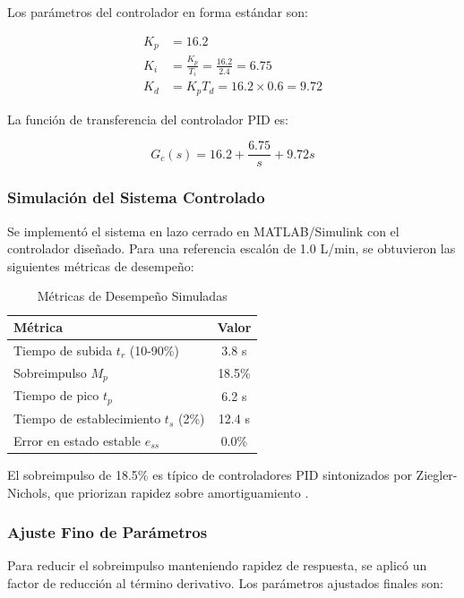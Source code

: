 \documentclass[conference]{IEEEtran}
\begin{document}
Los parámetros del controlador en forma estándar son:

\begin{align}
K_p &= 16.2 \\
K_i &= \frac{K_p}{T_i} = \frac{16.2}{2.4} = 6.75 \\
K_d &= K_p T_d = 16.2 \times 0.6 = 9.72
\end{align}

La función de transferencia del controlador PID es:

\begin{equation}
G_c(s) = 16.2 + \frac{6.75}{s} + 9.72s
\label{eq:controlador_pid}
\end{equation}

\subsubsection{Simulación del Sistema Controlado}

Se implementó el sistema en lazo cerrado en MATLAB/Simulink con el controlador diseñado. Para una referencia escalón de 1.0 L/min, se obtuvieron las siguientes métricas de desempeño:

\begin{table}[htbp]
\centering
\caption{Métricas de Desempeño Simuladas}
\label{tab:metricas_sim}
\begin{tabular}{lc}
\toprule
\textbf{Métrica} & \textbf{Valor} \\
\midrule
Tiempo de subida $t_r$ (10-90\%) & 3.8 s \\
Sobreimpulso $M_p$ & 18.5\% \\
Tiempo de pico $t_p$ & 6.2 s \\
Tiempo de establecimiento $t_s$ (2\%) & 12.4 s \\
Error en estado estable $e_{ss}$ & 0.0\% \\
\bottomrule
\end{tabular}
\end{table}

El sobreimpulso de 18.5\% es típico de controladores PID sintonizados por Ziegler-Nichols, que priorizan rapidez sobre amortiguamiento \cite{astrom}.

\subsubsection{Ajuste Fino de Parámetros}

Para reducir el sobreimpulso manteniendo rapidez de respuesta, se aplicó un factor de reducción al término derivativo. Los parámetros ajustados finales son:
\end{document}
